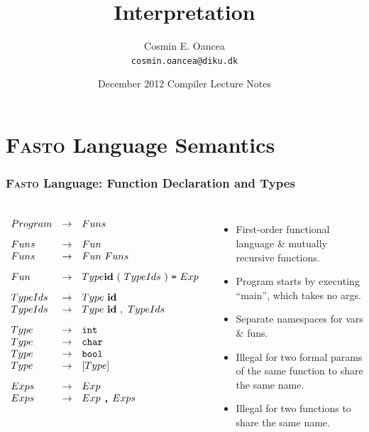 \documentclass{beamer}
\title[Interpretation]{Interpretation}
\author[C.~Oancea]{Cosmin E. Oancea\\{\tt cosmin.oancea@diku.dk}}
\institute{Department of Computer Science (DIKU)\\University of Copenhagen}
\date[December 2012]{December 2012 Compiler Lecture Notes}
\begin{document}
\titleslide



\begin{frame}[fragile]
	\tableofcontents
\end{frame}


\section{\textsc{Fasto} Language Semantics}


\begin{frame}[fragile,t]
\frametitle{\textsc{Fasto} Language: Function Declaration and Types}



\begin{columns}
\renewcommand{\arraystretch}{0.85}
\[\begin{array}{lcl}
Program & \rightarrow & Funs \\[2ex]

Funs & \rightarrow & Fun \\
Funs & \rightarrow & Fun~Funs \\[2ex]

Fun & \rightarrow & Type {\bf id}~(~TypeIds~)~\mbox{\tt =}~Exp \\[2ex]

TypeIds & \rightarrow & Type~{\bf id}           \\
TypeIds & \rightarrow & Type~{\bf id}~,~TypeIds \\[2ex]  

Type & \rightarrow & \mbox{\tt int}  \\
Type & \rightarrow & \mbox{\tt char} \\
Type & \rightarrow & \mbox{\tt bool} \\
Type & \rightarrow & {\tt [} Type {\tt ]} \\[2ex]

Exps & \rightarrow & Exp \\
Exps & \rightarrow & Exp~\mbox{\tt ,}~Exps
\end{array}\]

\begin{itemize}
    \item First-order functional language \& mutually recursive functions.
    \item Program starts by executing ``main'', which takes no args.
    \item Separate namespaces for vars \& funs.
    \item Illegal for two formal params of the same function to share the same name.
    \item Illegal for two functions to share the same name.
\end{itemize}
\end{columns}


\end{frame}
\end{document}
